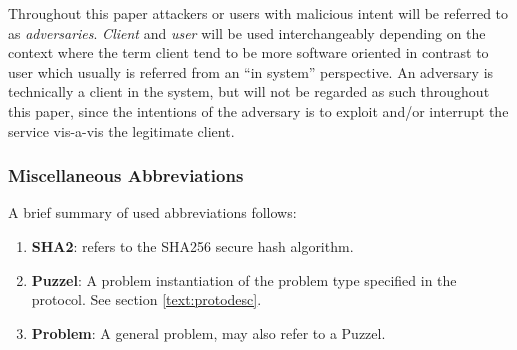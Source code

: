 Throughout this paper attackers or users with malicious intent will be referred to as \emph{adversaries}.
\emph{Client} and \emph{user} will be used interchangeably depending on the context where the term client tend to be more software oriented in contrast to user which usually is referred from an ``in system'' perspective.
An adversary is technically a client in the system, but will not be regarded as such throughout this paper, since the intentions of the adversary is to exploit and/or interrupt the service vis-a-vis the legitimate client. 

\subsubsection{Miscellaneous Abbreviations}
A brief summary of used abbreviations follows:
\begin{enumerate}
\item {\textbf{ SHA2}}: refers to the SHA256 secure hash algorithm\cite{sha2}.
\item \textbf{ Puzzel}: A problem instantiation of the problem type specified in the protocol. See section \ref{text:protodesc}.
\item \textbf{ Problem}: A general problem, may also refer to a Puzzel.
\end{enumerate}